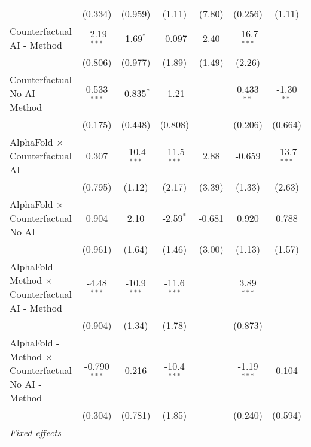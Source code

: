 \begin{tabular}{lcccccc}
                                                              & (0.334)        & (0.959)        & (1.11)        & (7.80)        & (0.256)       & (1.11)\\   
   Counterfactual AI - Method                                 & -2.19$^{***}$  & 1.69$^{*}$     & -0.097        & 2.40          & -16.7$^{***}$ &   \\   
                                                              & (0.806)        & (0.977)        & (1.89)        & (1.49)        & (2.26)        &   \\   
   Counterfactual No AI - Method                              & 0.533$^{***}$  & -0.835$^{*}$   & -1.21         &               & 0.433$^{**}$  & -1.30$^{**}$\\   
                                                              & (0.175)        & (0.448)        & (0.808)       &               & (0.206)       & (0.664)\\   
   AlphaFold $\times$ Counterfactual AI                       & 0.307          & -10.4$^{***}$  & -11.5$^{***}$ & 2.88          & -0.659        & -13.7$^{***}$\\   
                                                              & (0.795)        & (1.12)         & (2.17)        & (3.39)        & (1.33)        & (2.63)\\   
   AlphaFold $\times$ Counterfactual No AI                    & 0.904          & 2.10           & -2.59$^{*}$   & -0.681        & 0.920         & 0.788\\   
                                                              & (0.961)        & (1.64)         & (1.46)        & (3.00)        & (1.13)        & (1.57)\\   
   AlphaFold - Method $\times$ Counterfactual AI - Method     & -4.48$^{***}$  & -10.9$^{***}$  & -11.6$^{***}$ &               & 3.89$^{***}$  &   \\   
                                                              & (0.904)        & (1.34)         & (1.78)        &               & (0.873)       &   \\   
   AlphaFold - Method $\times$ Counterfactual No AI - Method  & -0.790$^{***}$ & 0.216          & -10.4$^{***}$ &               & -1.19$^{***}$ & 0.104\\   
                                                              & (0.304)        & (0.781)        & (1.85)        &               & (0.240)       & (0.594)\\   
   \midrule
   \emph{Fixed-effects}\\

\end{tabular}
